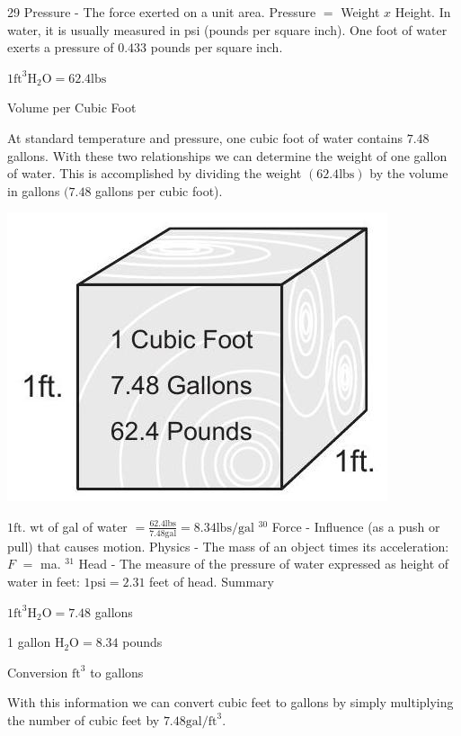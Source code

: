 \documentclass[10pt]{article}
\begin{document}
29 Pressure - The force exerted on a unit area. Pressure $=$ Weight $x$ Height. In water, it is usually measured in psi (pounds per square inch). One foot of water exerts a pressure of $0.433$ pounds per square inch.

$1 \mathrm{ft}^{3} \mathrm{H}_{2} \mathrm{O}=62.4 \mathrm{lbs}$

Volume per Cubic Foot

At standard temperature and pressure, one cubic foot of water contains $7.48$ gallons. With these two relationships we can determine the weight of one gallon of water. This is accomplished by dividing the weight $(62.4 \mathrm{lbs})$ by the volume in gallons $(7.48$ gallons per cubic foot).

\includegraphics[max width=\textwidth]{2022_11_03_65aa625ded296bdfd01fg-15}

$1 \mathrm{ft}$. wt of gal of water $=\frac{62.4 \mathrm{lbs}}{7.48 \mathrm{gal}}=8.34 \mathrm{lbs} / \mathrm{gal}$ ${ }^{30}$ Force - Influence (as a push or pull) that causes motion. Physics - The mass of an object times its acceleration: $F$ $=$ ma. ${ }^{31}$ Head - The measure of the pressure of water expressed as height of water in feet: $1 \mathrm{psi}=2.31$ feet of head. Summary

$1 \mathrm{ft}^{3} \mathrm{H}_{2} \mathrm{O}=7.48$ gallons

1 gallon $\mathrm{H}_{2} \mathrm{O}=8.34$ pounds

Conversion $\mathrm{ft}^{3}$ to gallons

With this information we can convert cubic feet to gallons by simply multiplying the number of cubic feet by $7.48 \mathrm{gal} / \mathrm{ft}^{3}$.
\end{document}
